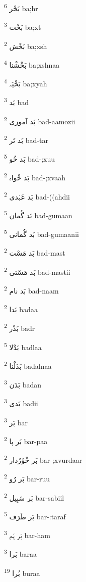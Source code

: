 \documentclass[12pt]{article}
\begin{document}
\begin{RTL}
\begin{multicols}{5}
{\ur بَحْر}   \textsuperscript{6} ba;hr

{\ur بَخْت}   \textsuperscript{3} ba;xt

{\ur بَخْش}   \textsuperscript{2} ba;xsh

{\ur بَخْشْنا}   \textsuperscript{4} ba;xshnaa

{\ur بَخْیَہ}   \textsuperscript{4} ba;xyah

{\ur بَد}   \textsuperscript{3} bad

{\ur بَد آموزی}   \textsuperscript{2} bad-aamozii

{\ur بَد تَر}   \textsuperscript{2} bad-tar

{\ur بَد خُو}   \textsuperscript{5} bad-;xuu

{\ur بَد خْواہ}   \textsuperscript{2} bad-;xvaah

{\ur بَد عَہْدی}   \textsuperscript{2} bad-((ahdii

{\ur بَد گُمان}   \textsuperscript{5} bad-gumaan

{\ur بَد گُمانی}   \textsuperscript{5} bad-gumaanii

{\ur بَد مَسْت}   \textsuperscript{2} bad-mast

{\ur بَد مَسْتی}   \textsuperscript{2} bad-mastii

{\ur بَد نام}   \textsuperscript{2} bad-naam

{\ur بَدا}   \textsuperscript{2} badaa

{\ur بَدْر}   \textsuperscript{2} badr

{\ur بَدْلا}   \textsuperscript{5} badlaa

{\ur بَدَلْنا}   \textsuperscript{2} badalnaa

{\ur بَدَن}   \textsuperscript{3} badan

{\ur بَدی}   \textsuperscript{3} badii

{\ur بَر}   \textsuperscript{3} bar

{\ur بَر پا}   \textsuperscript{2} bar-paa

{\ur بَر خْوُرْدار}   \textsuperscript{2} bar-;xvurdaar

{\ur بَر رُو}   \textsuperscript{2} bar-ruu

{\ur بَر سَبِیل}   \textsuperscript{2} bar-sabiil

{\ur بَر طَرَف}   \textsuperscript{5} bar-:taraf

{\ur بَر ہَم}   \textsuperscript{3} bar-ham

{\ur بَرا}   \textsuperscript{3} baraa

{\ur بُرا}   \textsuperscript{19} buraa


\end{multicols}
\end{RTL}
\end{document}
